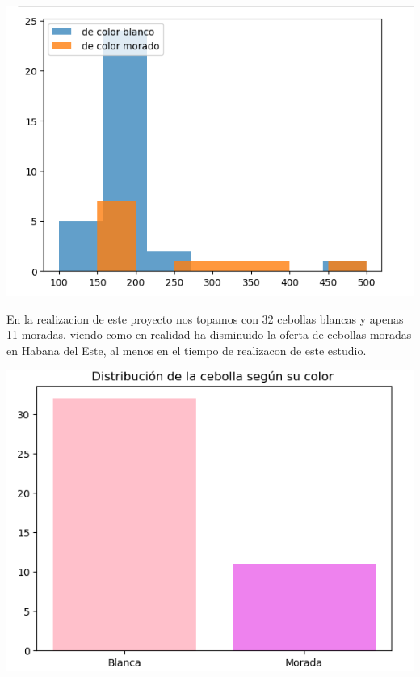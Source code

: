 \documentclass[a4paper,11pt]{article}
\begin{document}
\par\vspace{2pt}
\begin{minipage}{0.5\textwidth}
\begin{center}
  \includegraphics[width=1.5\textwidth]{precio por color cebolla.png}
\end{center}
\end{minipage}
\par\vspace{2pt}
En la realizacion de este proyecto nos topamos con 32 cebollas blancas y apenas 11 moradas, viendo como en realidad ha disminuido la oferta de cebollas moradas en Habana del Este, al menos en el tiempo de realizacon de este estudio.
\par\vspace{2pt}
\begin{minipage}{0.5\textwidth}
\begin{center}
  \includegraphics[width=1.5\textwidth]{color de la cebolla.png}
\end{center}
\end{minipage}
\end{document}
